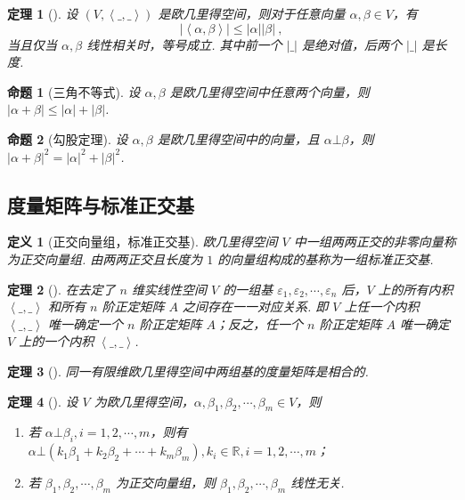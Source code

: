 \documentclass[zihao=-4,UTF8,linespread=1.8,nothm]{aytony_base}
\newtheorem{theorem}{\indent 定理}[subsection]
\newtheorem{proposition}{\indent 命题}[subsection]
\newtheorem{definition}{\indent 定义}[subsection]
\begin{document}
\begin{theorem}[]
    设 $(V, \left<\_, \_\right>)$ 是欧几里得空间，则对于任意向量 $\alpha, \beta \in V$，有 $$
        |\left<\alpha, \beta\right>| \leqslant |\alpha||\beta|\ ,
    $$ 当且仅当 $\alpha, \beta$ 线性相关时，等号成立. 其中前一个 $|\_|$ 是绝对值，后两个 $|\_|$ 是长度.
\end{theorem}

\begin{proposition}[三角不等式]
    设 $\alpha, \beta$ 是欧几里得空间中任意两个向量，则 $|\alpha + \beta| \leqslant |\alpha| + |\beta|$.
\end{proposition}

\begin{proposition}[勾股定理]
    设 $\alpha, \beta$ 是欧几里得空间中的向量，且 $\alpha \bot \beta$，则 $|\alpha + \beta|^2 = |\alpha|^2 + |\beta|^2$.
\end{proposition}

\subsection{度量矩阵与标准正交基}

\begin{definition}[正交向量组，标准正交基]
    欧几里得空间 $V$ 中一组两两正交的非零向量称为正交向量组. 由两两正交且长度为 $1$ 的向量组构成的基称为一组标准正交基.
\end{definition}

\begin{theorem}[]
    在去定了 $n$ 维实线性空间 $V$ 的一组基 ${\varepsilon}_1, {\varepsilon}_2, \cdots, {\varepsilon}_{n}$ 后，$V$ 上的所有内积 $\left<\_, \_\right>$ 和所有 $n$ 阶正定矩阵 $A$ 之间存在一一对应关系. 即 $V$ 上任一个内积 $\left<\_, \_\right>$ 唯一确定一个 $n$ 阶正定矩阵 $A$；反之，任一个 $n$ 阶正定矩阵 $A$ 唯一确定 $V$ 上的一个内积 $\left<\_, \_\right>$.
\end{theorem}

\begin{theorem}[]
    同一有限维欧几里得空间中两组基的度量矩阵是相合的.
\end{theorem}

\begin{theorem}[]
    设 $V$ 为欧几里得空间，$\alpha, \beta_1, \beta_2, \cdots, \beta_m \in V$，则
    \begin{enumerate}[nosep]
        \item 若 $\alpha \bot \beta_i, i = 1, 2, \cdots, m$，则有 $\alpha \bot ({k}_1\beta_1+ {k}_2\beta_2+ \cdots+ {k}_{m}\beta_m),k_i \in \mathbb{R},i=1, 2, \cdots, m$；
        \item 若 ${\beta}_1, {\beta}_2, \cdots, {\beta}_{m}$ 为正交向量组，则 ${\beta}_1, {\beta}_2, \cdots, {\beta}_{m}$ 线性无关.
    \end{enumerate}
\end{theorem}
\end{document}
